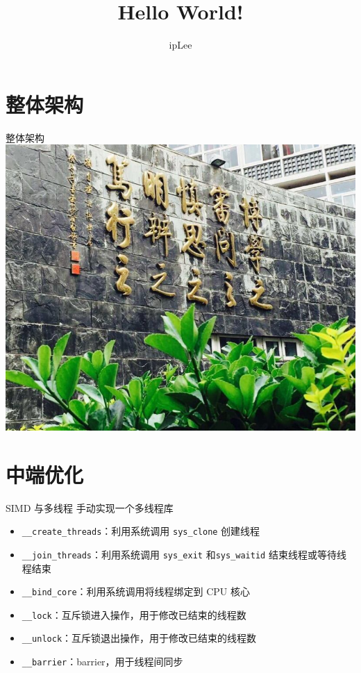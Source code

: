 \documentclass[aspectratio=169,UTF-8]{ctexbeamer}
\title{Hello World!}
\author{ipLee}
\institute{Beijing Jiaotong University}
\begin{document}
	\maketitle
	
	\begin{frame}
		\tableofcontents
	\end{frame}
	
	\section{整体架构}
	
		\begin{frame}{整体架构}
			\includegraphics[width=\textheight]{pic/BJTU_Spring.jpg}
		\end{frame}
			
	\section{中端优化}

		\begin{frame}{SIMD 与多线程}
			手动实现一个多线程库
			
			\begin{itemize}
				\item \lstinline{__create_threads}：利用系统调用 \lstinline{sys_clone} 创建线程
				\item \lstinline{__join_threads}：利用系统调用 \lstinline{sys_exit} 和\lstinline{sys_waitid} 结束线程或等待线程结束
				\item \lstinline{__bind_core}：利用系统调用将线程绑定到 CPU 核心
				\item \lstinline{__lock}：互斥锁进入操作，用于修改已结束的线程数
				\item \lstinline{__unlock}：互斥锁退出操作，用于修改已结束的线程数
				\item \lstinline{__barrier}：barrier，用于线程间同步
			\end{itemize}
			
		\end{frame}
		
\end{document}
